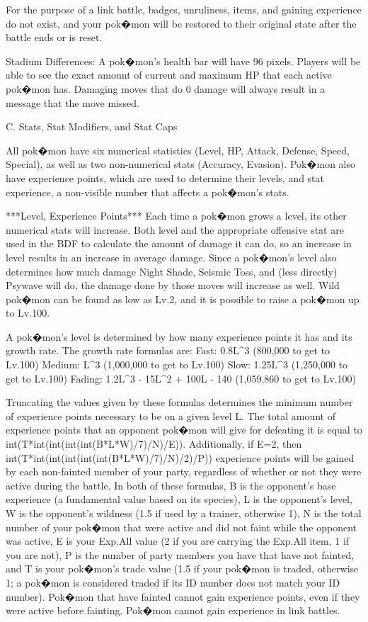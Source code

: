 \documentclass[reprint, aps, prl, paper=A4]{revtex4-1}
\begin{document}
For the purpose of a link battle, badges, unruliness, items, and gaining experience do not
exist, and your pok�mon will be restored to their original state after the battle ends or is
reset.


Stadium Differences:
A pok�mon's health bar will have 96 pixels. Players will be able to see the exact amount of
current and maximum HP that each active pok�mon has. Damaging moves that do 0 damage will
always result in a message that the move missed.



C. Stats, Stat Modifiers, and Stat Caps

All pok�mon have six numerical statistics (Level, HP, Attack, Defense, Speed, Special), as well
as two non-numerical stats (Accuracy, Evasion). Pok�mon also have experience points, which are
used to determine their levels, and stat experience, a non-visible number that affects a
pok�mon's stats.

***Level, Experience Points***
Each time a pok�mon grows a level, its other numerical stats will increase. Both level and the
appropriate offensive stat are used in the BDF to calculate the amount of damage it can do, so
an increase in level results in an increase in average damage. Since a pok�mon's level also
determines how much damage Night Shade, Seismic Toss, and (less directly) Psywave will do, the
damage done by those moves will increase as well. Wild pok�mon can be found as low as Lv.2, and
it is possible to raise a pok�mon up to Lv.100.

A pok�mon's level is determined by how many experience points it has and its growth rate. The
growth rate formulas are:
     Fast:   0.8L^3                          (800,000 to get to Lv.100)
     Medium: L^3                           (1,000,000 to get to Lv.100)
     Slow:   1.25L^3                       (1,250,000 to get to Lv.100)
     Fading: 1.2L^3 - 15L^2 + 100L - 140   (1,059,860 to get to Lv.100)

Truncating the values given by these formulas determines the minimum number of experience
points necessary to be on a given level L. The total amount of experience points that an
opponent pok�mon will give for defeating it is equal to int(T*int(int(int(int(B*L*W)/7)/N)/E)).
Additionally, if E=2, then int(T*int(int(int(int(int(B*L*W)/7)/N)/2)/P)) experience points will
be gained by each non-fainted member of your party, regardless of whether or not they were
active during the battle. In both of these formulas, B is the opponent's base experience (a
fundamental value based on its species), L is the opponent's level, W is the opponent's
wildness (1.5 if used by a trainer, otherwise 1), N is the total number of your pok�mon that
were active and did not faint while the opponent was active, E is your Exp.All value (2 if you
are carrying the Exp.All item, 1 if you are not), P is the number of party members you have
that have not fainted, and T is your pok�mon's trade value (1.5 if your pok�mon is traded,
otherwise 1; a pok�mon is considered traded if its ID number does not match your ID number).
Pok�mon that have fainted cannot gain experience points, even if they were active before
fainting. Pok�mon cannot gain experience in link battles.
\end{document}
